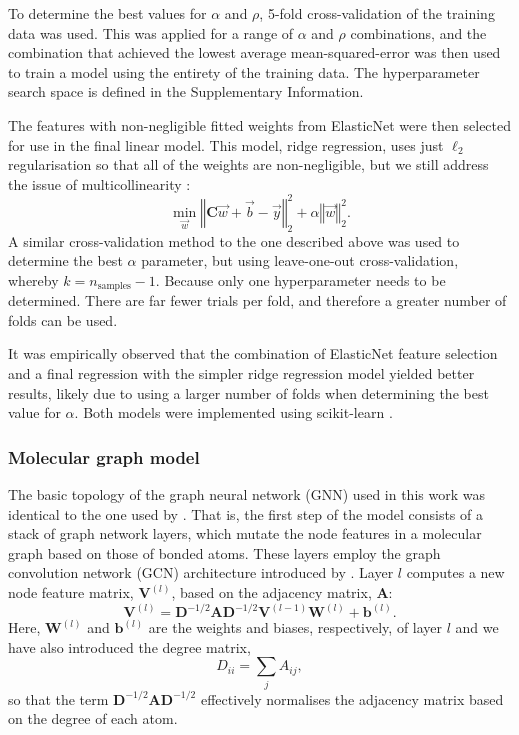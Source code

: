 To determine the best values for $\alpha$ and $\rho$, 5-fold cross-validation of
the training data was used. This was applied for a range of $\alpha$ and $\rho$
combinations, and the combination that achieved the lowest average
mean-squared-error was then used to train a model using the entirety of the
training data. The hyperparameter search space is defined in the Supplementary
Information.

The features with non-negligible fitted weights from ElasticNet were then selected for use in the final linear model. This model, ridge regression, uses just $\ell_2$ regularisation so that all of the weights are non-negligible, but we
still address the issue of multicollinearity \cite{mcdonaldRidgeRegression2009}:
\begin{equation}
    \min_{\vec{w}} \left \Vert \mathbf{C} \vec{w} + \vec{b} - \vec{y} \right \Vert_2^2 + \alpha \left \Vert \vec{w}\right \Vert_2^2.
\end{equation}
A similar cross-validation method to the one described above was used to determine the best $\alpha$ parameter, but using leave-one-out cross-validation, whereby $k=n_\text{samples}-1$. Because only one hyperparameter needs to be determined. There are far fewer trials per
fold, and therefore a greater number of folds can be used.

It was empirically observed that the combination of ElasticNet feature selection and a final regression with the simpler ridge regression model yielded better results, likely due to using a larger number of folds when determining the best value for $\alpha$. Both models were implemented using scikit-learn \cite{pedregosaScikitlearnMachineLearning2011}.

\subsubsection{Molecular graph model}

The basic topology of the graph neural network (GNN) used in this work was identical to the one used by \citeqin. That is, the first step of the model consists of a stack of graph network layers, which mutate the node features in a molecular graph based on those of bonded atoms.
These layers employ the graph convolution network (GCN) architecture introduced by \cite{kipfSemiSupervisedClassificationGraph2017a}. Layer $l$ computes a new node feature matrix, $\mathbf{V}^{(l)}$, based on the adjacency matrix, $\mathbf{A}$:
\begin{equation}
    \mathbf{V}^{(l)} = \mathbf{D}^{-1/2} \mathbf{A} \mathbf{D}^{-1/2} \mathbf{V}^{(l-1)} \mathbf{W}^{(l)} + \mathbf{b}^{(l)}.
\end{equation}
Here, $\mathbf{W}^{(l)}$ and $\mathbf{b}^{(l)}$ are the weights and biases,
respectively, of layer $l$ and we have also introduced the degree matrix,
\begin{equation}
    D_{ii} = \sum_j A_{ij},
\end{equation}
so that the term $\mathbf{D}^{-1/2} \mathbf{A}
    \mathbf{D}^{-1/2}$ effectively normalises the adjacency matrix based on
the degree of each atom.

